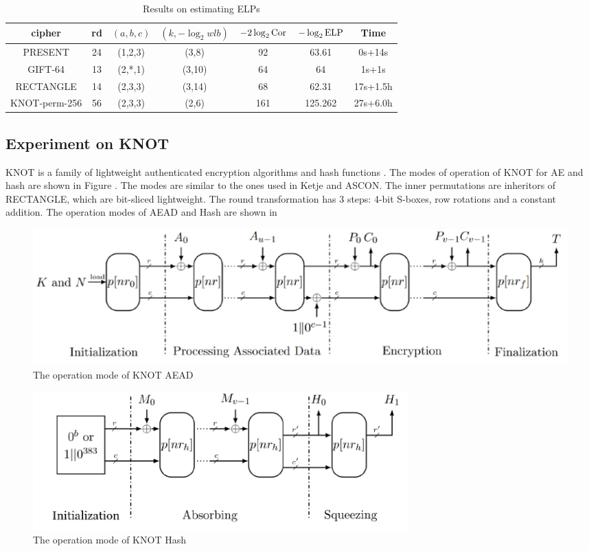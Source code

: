 \begin{table}
	\caption{Results on estimating ELPs}\label{tab:ELP}
	\centering
	\begin{tabular}{|c|c|c|c|c|c|c|}
		\hline
		cipher & rd & $(a,b,c)$ & $(k,-\log_2wlb)$ & $-2\log_2\text{Cor}$ & $-\log_2\text{ELP}$ & Time \\
		\hline
		PRESENT & 24 & (1,2,3) & (3,8) & 92 & 63.61 & 0s+14s\\
		\hline
		GIFT-64 & 13 & (2,*,1) & (3,10) & 64 & 64 & 1s+1s\\
		\hline 
		RECTANGLE & 14 & (2,3,3) & (3,14) & 68 & 62.31 & 17s+1.5h \\
		\hline
		KNOT-perm-256 & 56 & (2,3,3) & (2,6) & 161 & 125.262 & 27s+6.0h\\
		\hline
	\end{tabular}
\end{table}



\subsection{Experiment on KNOT}

KNOT is a family of lightweight authenticated encryption algorithms and hash functions \cite{ZDY19}. The modes of operation of KNOT for AE and hash are shown in Figure . The modes are similar to the ones used in Ketje and ASCON. The inner permutations are inheritors of RECTANGLE, which are bit-sliced lightweight. The round transformation has 3 steps: 4-bit S-boxes, row rotations and a constant addition. The operation modes of AEAD and Hash are shown in 

\begin{figure}
	\centering
	\includegraphics[width=1\textwidth]{fig/mode_aead.PNG}
	\caption{The operation mode of KNOT AEAD} \label{fig:mode_aead}
\end{figure}

\begin{figure}
	\centering
	\includegraphics[width=0.7\textwidth]{fig/mode_hash.PNG}
	\caption{The operation mode of KNOT Hash} \label{fig:mode_hash}
\end{figure}

